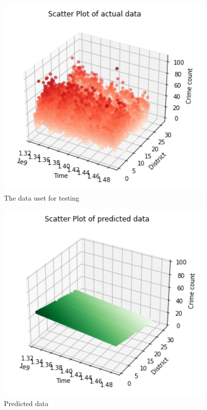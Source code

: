 \documentclass[a4paper, twocolumn]{article}
\begin{document}
\begin{figure}[h]
    \label{figure:}
    \includegraphics[scale=0.3]{fig7.png}
    \caption{The data uset for testing}
\end{figure}

\begin{figure}[h]
    \label{figure:}
    \includegraphics[scale=0.3]{fig8.png}
    \caption{Predicted data}
\end{figure}
\end{document}
